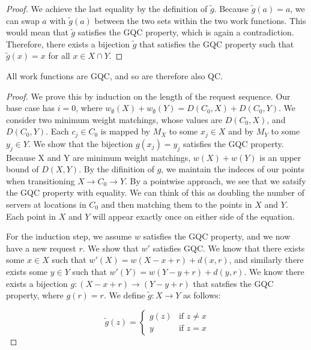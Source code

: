 \begin{proof}
    We achieve the last equality by the definition of $\tilde{g}$. Because $\tilde{g}(a) = a$, we can swap $a$ with $\tilde{g}(a)$ between the two sets within the two work functions. This would mean that $\tilde{g}$ satisfies the GQC property, which is again a contradiction. Therefore, there exists a bijection $\tilde{g}$ that satisfies the GQC property such that $\tilde{g}(x) = x$ for all $x \in X \cap Y$.
\end{proof}

\begin{lemma}
All work functions are GQC, and so are therefore also QC.
\end{lemma}

\begin{proof}
    We prove this by induction on the length of the request sequence. Our base case has $i = 0$, where $w_{\emptyset}(X) + w_{\emptyset}(Y) = D(C_0, X) + D(C_0, Y)$. We consider two minimum weight matchings, whose values are $D(C_0, X)$, and $D(C_0, Y)$. Each $c_j \in C_0$ is mapped by $M_X$ to some $x_j \in X$ and by $M_Y$ to some $y_j \in Y$. We show that the bijection $g(x_j) = y_j$ satisfies the GQC property. Because X and Y are minimum weight matchings, $w(X) + w(Y)$ is an upper bound of $D(X, Y)$. By the difinition of $g$, we maintain the indeces of our points when transitioning $X \rightarrow C_0 \rightarrow Y$. By a pointwise approach, we see that we satsify the GQC property with equality. We can think of this as doubling the number of servers at locations in $C_0$ and then matching them to the points in $X$ and $Y$. Each point in $X$ and $Y$ will appear exactly once on either side of the equation.

    For the induction step, we assume $w$ satisfies the GQC property, and we now have a new request $r$. We show that $w'$ satisfies GQC. We know that there exists some $x \in X$ such that $w'(X) = w(X-x+r) + d(x,r)$, and similarly there exists some $y \in Y$ such that $w'(Y) = w(Y-y+r) + d(y,r)$. We know there exists a bijection $g: (X-x+r) \rightarrow (Y-y+r)$ that satsfies the GQC property, where $g(r) = r$. We define $\tilde{g}: X \rightarrow Y$ as follows:

    \begin{equation*}
        \tilde{g}(z) = \begin{cases}
            g(z) & \text{if } z \neq x \\
            y & \text{if } z = x
        \end{cases}
    \end{equation*}


\end{proof}
